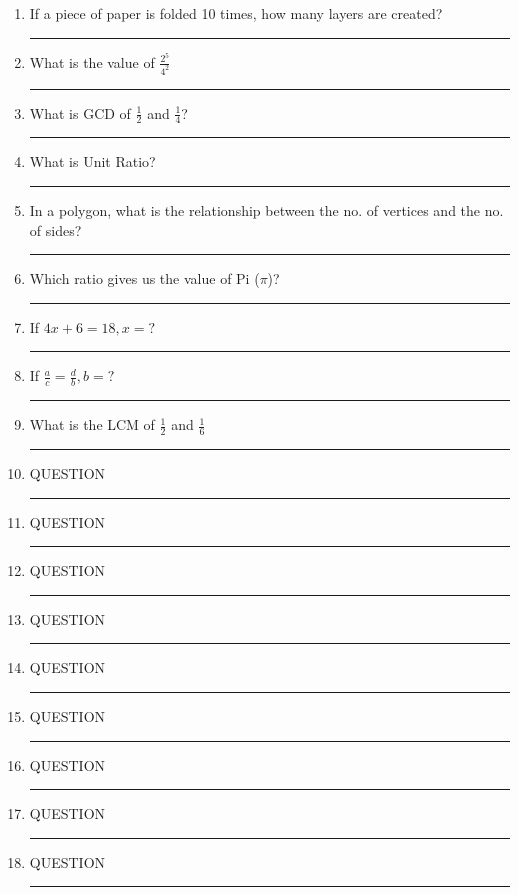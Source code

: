 \documentclass{exam}
\begin{document}
\begin{enumerate}

\item If a piece of paper is folded 10 times, how many layers are created? \noindent\rule{2cm}{0.4pt}

\item What is the value of $\frac{2^5}{4^2}$ \noindent\rule{1cm}{0.4pt}

\item What is GCD of $\frac12$ and $\frac14$? \noindent\rule{1cm}{0.4pt}

\item What is Unit Ratio? \noindent\rule{1cm}{0.4pt}

\item In a polygon, what is the relationship between the no. of vertices and
the no. of sides? \noindent\rule{1cm}{0.4pt}

\item Which ratio gives us the value of Pi ($\pi$)? \noindent\rule{1cm}{0.4pt}

\item If $4x+6 = 18, x = ?$  \noindent\rule{1cm}{0.4pt}

\item If $\frac ac = \frac db, b = ?$ \noindent\rule{1cm}{0.4pt}

\item What is the LCM of $\frac 12$ and $\frac 16$ \noindent\rule{1cm}{0.4pt}

\item QUESTION \noindent\rule{1cm}{0.4pt}


\item QUESTION \noindent\rule{1cm}{0.4pt}

\item QUESTION \noindent\rule{1cm}{0.4pt}

\item QUESTION \noindent\rule{1cm}{0.4pt}

\item QUESTION \noindent\rule{1cm}{0.4pt}

\item QUESTION \noindent\rule{1cm}{0.4pt}

\item QUESTION \noindent\rule{1cm}{0.4pt}

\item QUESTION \noindent\rule{1cm}{0.4pt}

\item QUESTION \noindent\rule{1cm}{0.4pt}

\end{enumerate}
\end{document}
